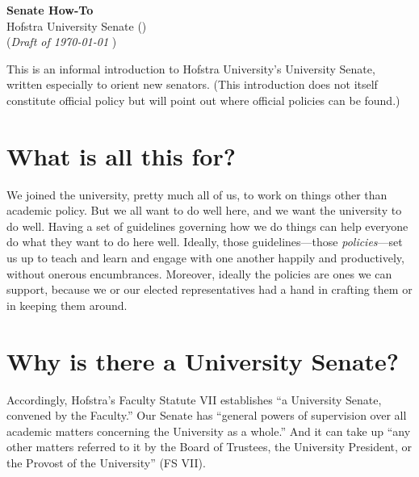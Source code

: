 \documentclass[12pt]{article}
\begin{document}
\thispagestyle{empty}



\begin{center}
  \textbf{\large Senate How-To} \\ Hofstra University Senate (\the\year) \\ (\emph{Draft of \today} )
\end{center}



\noindent This is an informal introduction to Hofstra University's University
Senate, written especially to orient new senators. (This introduction
does not itself constitute official policy but will point out where
official policies can be found.)



\begin{center}
\begin{minipage}[c]{4.25in} %
\tableofcontents
\end{minipage}
\end{center}



\section{What is all this for?}\label{what-is-all-this-for}

We joined the university, pretty much all of us, to work on things other
than academic policy. But we all want to do well here, and we want the
university to do well. Having a set of guidelines governing how we do
things can help everyone do what they want to do here well. Ideally,
those guidelines---those \emph{policies}---set us up to teach and learn
and engage with one another happily and productively, without onerous
encumbrances. Moreover, ideally the policies are ones we can support,
because we or our elected representatives had a hand in crafting them or
in keeping them around.

\section{Why is there a University
Senate?}\label{why-is-there-a-university-senate}

Accordingly, Hofstra's Faculty Statute VII establishes ``a University
Senate, convened by the Faculty.'' Our Senate has ``general powers of
supervision over all academic matters concerning the University as a
whole.'' And it can take up ``any other matters referred to it by the
Board of Trustees, the University President, or the Provost of the
University'' (FS VII).
\end{document}
